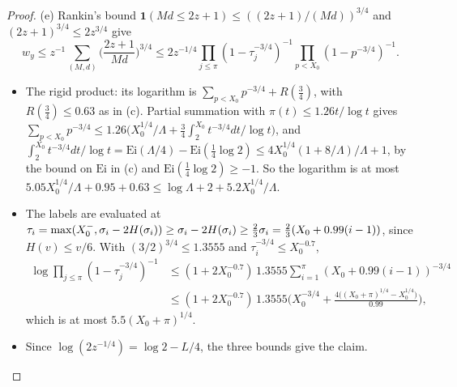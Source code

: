 \begin{proof}
(e) Rankin's bound $\mathbf 1(Md\le2z+1)\le((2z+1)/(Md))^{3/4}$ and $(2z+1)^{3/4}\le2z^{3/4}$ give
\[
w_y\le z^{-1}\sum_{(M,d)}\Big(\frac{2z+1}{Md}\Big)^{3/4}\le2z^{-1/4}\prod_{j\le\pi}(1-\tau_j^{-3/4})^{-1}
\prod_{p<X_0}(1-p^{-3/4})^{-1}.
\]
\begin{itemize}
\item The rigid product: its logarithm is $\sum_{p<X_0}p^{-3/4}+R(\tfrac34)$, with $R(\tfrac34)\le0.63$ as in (c).
  Partial summation with $\pi(t)\le1.26t/\log t$ gives
  $\sum_{p<X_0}p^{-3/4}\le1.26\big(X_0^{1/4}/\Lambda+\tfrac34\int_2^{X_0}t^{-3/4}dt/\log t\big)$, and
  $\int_2^{X_0}t^{-3/4}dt/\log t=\mathrm{Ei}(\Lambda/4)-\mathrm{Ei}(\tfrac14\log2)\le4X_0^{1/4}(1+8/\Lambda)/\Lambda+1$, by the
  bound on $\mathrm{Ei}$ in (c) and $\mathrm{Ei}(\tfrac14\log2)\ge-1$. So the logarithm is at most
  $5.05X_0^{1/4}/\Lambda+0.95+0.63\le\log\Lambda+2+5.2X_0^{1/4}/\Lambda$.
\item The labels are evaluated at $\tau_i=\max(X_0^{-},\sigma_i-2H(\sigma_i))\ge\sigma_i-2H(\sigma_i)\ge\tfrac23\sigma_i
  =\tfrac23(X_0+0.99(i-1))$, since $H(v)\le v/6$. With $(3/2)^{3/4}\le1.3555$ and $\tau_i^{-3/4}\le X_0^{-0.7}$,
  \begin{align*}
  \log\prod_{j\le\pi}(1-\tau_j^{-3/4})^{-1}&\le(1+2X_0^{-0.7})\,1.3555\sum_{i=1}^{\pi}(X_0+0.99(i-1))^{-3/4}\\
  &\le(1+2X_0^{-0.7})\,1.3555\Big(X_0^{-3/4}+\frac{4\big((X_0+\pi)^{1/4}-X_0^{1/4}\big)}{0.99}\Big),
  \end{align*}
  which is at most $5.5(X_0+\pi)^{1/4}$.
\item Since $\log(2z^{-1/4})=\log2-L/4$, the three bounds give the claim. \qedhere
\end{itemize}
\end{proof}

